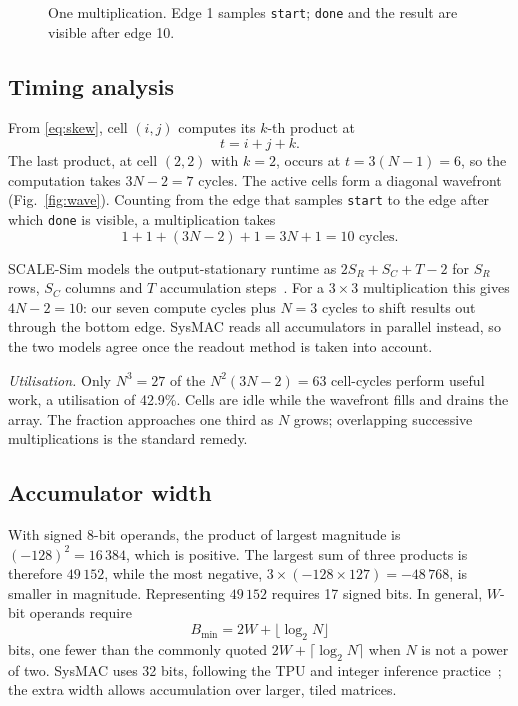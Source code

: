 \documentclass[conference]{IEEEtran}
\newcommand{\code}[1]{\texttt{#1}}
\begin{document}
\begin{figure}[t]
\centering
\resizebox{\columnwidth}{!}{}
\caption{One multiplication. Edge 1 samples \code{start}; \code{done} and the result are visible after edge 10.}
\label{fig:timing}
\end{figure}


\subsection{Timing analysis}
\label{sec:timing}
From \eqref{eq:skew}, cell $(i,j)$ computes its $k$-th product at
\begin{equation}
t = i + j + k .
\label{eq:when}
\end{equation}
The last product, at cell $(2,2)$ with $k = 2$, occurs at $t = 3(N-1) = 6$, so the computation takes $3N - 2 = 7$ cycles. The active cells form a diagonal wavefront (Fig.~\ref{fig:wave}). Counting from the edge that samples \code{start} to the edge after which \code{done} is visible, a multiplication takes
\begin{equation}
1 + 1 + (3N-2) + 1 = 3N + 1 = 10 \text{ cycles}.
\end{equation}

SCALE-Sim models the output-stationary runtime as $2S_R + S_C + T - 2$ for $S_R$ rows, $S_C$ columns and $T$ accumulation steps~\cite{scalesim2020}. For a $3 \times 3$ multiplication this gives $4N - 2 = 10$: our seven compute cycles plus $N = 3$ cycles to shift results out through the bottom edge. SysMAC reads all accumulators in parallel instead, so the two models agree once the readout method is taken into account.

\emph{Utilisation.} Only $N^3 = 27$ of the $N^2(3N-2) = 63$ cell-cycles perform useful work, a utilisation of 42.9\%. Cells are idle while the wavefront fills and drains the array. The fraction approaches one third as $N$ grows; overlapping successive multiplications is the standard remedy.

\subsection{Accumulator width}
With signed 8-bit operands, the product of largest magnitude is $(-128)^2 = 16\,384$, which is positive. The largest sum of three products is therefore $49\,152$, while the most negative, $3 \times (-128 \times 127) = -48\,768$, is smaller in magnitude. Representing $49\,152$ requires 17 signed bits. In general, $W$-bit operands require
\begin{equation}
B_{\min} = 2W + \lfloor \log_2 N \rfloor
\end{equation}
bits, one fewer than the commonly quoted $2W + \lceil \log_2 N \rceil$ when $N$ is not a power of two. SysMAC uses 32 bits, following the TPU and integer inference practice~\cite{jouppi2017, jacob2018}; the extra width allows accumulation over larger, tiled matrices.
\end{document}
